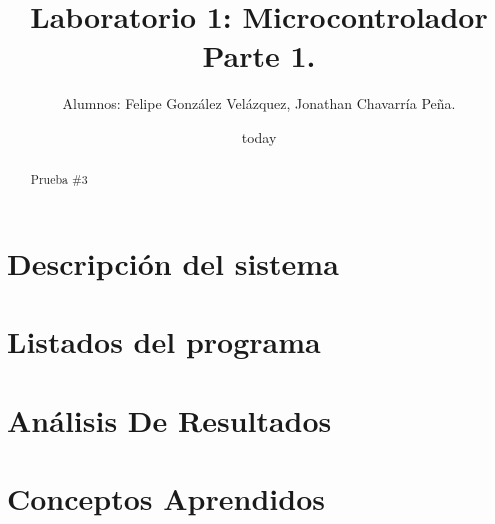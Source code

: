 \documentclass[12pt,letterpapers]{IEEEtran}
\date{today}
\title{Laboratorio 1: Microcontrolador Parte 1.}
\author{Alumnos: Felipe González Velázquez, Jonathan Chavarría Peña.}
\begin{document}
\renewcommand{\leftmark}{UNIVERSIDAD LATINA DE COSTA RICA -- BINGE-57 Arquitectura de Computadores}
\maketitle
	\begin{abstract}
	Prueba \#3
	\end{abstract}
\section{Descripción del sistema}

\section{Listados del programa}

\section{Análisis De Resultados}

\section{Conceptos Aprendidos}  
\end{document}
